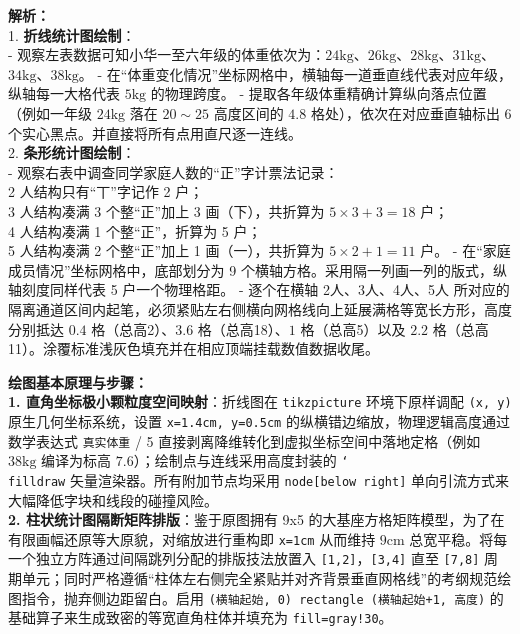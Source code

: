 {\small\color{gray}
\textbf{解析：}\\
1. \textbf{折线统计图绘制}：\\
- 观察左表数据可知小华一至六年级的体重依次为：$24\text{kg}$、$26\text{kg}$、$28\text{kg}$、$31\text{kg}$、$34\text{kg}$、$38\text{kg}$。
- 在“体重变化情况”坐标网格中，横轴每一道垂直线代表对应年级，纵轴每一大格代表 $5\text{kg}$ 的物理跨度。
- 提取各年级体重精确计算纵向落点位置（例如一年级 $24\text{kg}$ 落在 $20 \sim 25$ 高度区间的 $4.8$ 格处），依次在对应垂直轴标出 6 个实心黑点。并直接将所有点用直尺逐一连线。\\
2. \textbf{条形统计图绘制}：\\
- 观察右表中调查同学家庭人数的“正”字计票法记录：\\
  2 人结构只有“丅”字记作 2 户；\\
  3 人结构凑满 3 个整“正”加上 3 画（下），共折算为 $5\times3+3=18$ 户；\\
  4 人结构凑满 1 个整“正”，折算为 5 户；\\
  5 人结构凑满 2 个整“正”加上 1 画（一），共折算为 $5\times2+1=11$ 户。
- 在“家庭成员情况”坐标网格中，底部划分为 9 个横轴方格。采用隔一列画一列的版式，纵轴刻度同样代表 5 户一个物理格距。
- 逐个在横轴 2人、3人、4人、5人 所对应的隔离通道区间内起笔，必须紧贴左右侧横向网格线向上延展满格等宽长方形，高度分别抵达 $0.4$ 格（总高2）、$3.6$ 格（总高18）、$1$ 格（总高5）以及 $2.2$ 格（总高11）。涂覆标准浅灰色填充并在相应顶端挂载数值数据收尾。
}

\vspace{0.6cm}

{\small\color{blue!70!black}
\textbf{绘图基本原理与步骤：}\\
\textbf{1. 直角坐标极小颗粒度空间映射}：折线图在 \texttt{tikzpicture} 环境下原样调配 \texttt{(x, y)} 原生几何坐标系统，设置 \texttt{x=1.4cm, y=0.5cm} 的纵横错边缩放，物理逻辑高度通过数学表达式 \texttt{真实体重} / 5 直接剥离降维转化到虚拟坐标空间中落地定格（例如 $38\text{kg}$ 编译为标高 $7.6$）；绘制点与连线采用高度封装的 \texttt{\char`\\filldraw} 矢量渲染器。所有附加节点均采用 \texttt{node[below right]} 单向引流方式来大幅降低字块和线段的碰撞风险。\\
\textbf{2. 柱状统计图隔断矩阵排版}：鉴于原图拥有 9x5 的大基座方格矩阵模型，为了在有限画幅还原等大原貌，对缩放进行重构即 \texttt{x=1cm} 从而维持 $9\text{cm}$ 总宽平稳。将每一个独立方阵通过间隔跳列分配的排版技法放置入 \texttt{[1,2]}，\texttt{[3,4]} 直至 \texttt{[7,8]} 周期单元；同时严格遵循“柱体左右侧完全紧贴并对齐背景垂直网格线”的考纲规范绘图指令，抛弃侧边距留白。启用 \texttt{(横轴起始, 0) rectangle (横轴起始+1, 高度)} 的基础算子来生成致密的等宽直角柱体并填充为 \texttt{fill=gray!30}。
}

